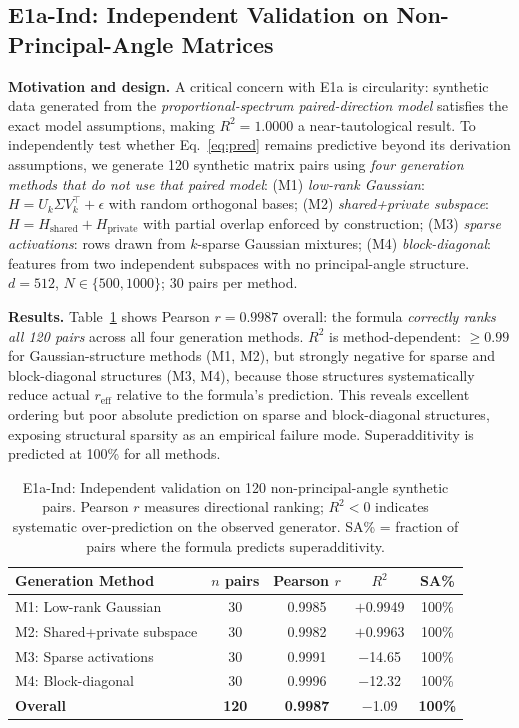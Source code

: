 \documentclass{article}
\begin{document}
\subsection{E1a-Ind: Independent Validation on Non-Principal-Angle Matrices}
\label{sec:e1a_ind}

\textbf{Motivation and design.}
A critical concern with E1a is circularity: synthetic data generated from the
\emph{proportional-spectrum paired-direction model} satisfies the exact
model assumptions,
making $R^2=1.0000$ a near-tautological result.
To independently test whether Eq.~\eqref{eq:pred} remains predictive
beyond its derivation assumptions, we generate 120 synthetic matrix pairs
using \emph{four generation methods that do not use that paired model}:
(M1) \emph{low-rank Gaussian}: $H=U_k\Sigma V_k^\top + \epsilon$ with random orthogonal bases;
(M2) \emph{shared+private subspace}: $H=H_{\mathrm{shared}}+H_{\mathrm{private}}$ with
partial overlap enforced by construction;
(M3) \emph{sparse activations}: rows drawn from $k$-sparse Gaussian mixtures;
(M4) \emph{block-diagonal}: features from two independent subspaces with no principal-angle structure.
$d=512$, $N\in\{500,1000\}$; 30 pairs per method.

\textbf{Results.}
Table~\ref{tab:e1a_ind} shows Pearson $r=0.9987$ overall: the formula
\emph{correctly ranks all 120 pairs} across all four generation methods.
$R^2$ is method-dependent: $\geq0.99$ for Gaussian-structure methods (M1, M2),
but strongly negative for sparse and block-diagonal structures (M3, M4),
because those structures systematically reduce actual $r_{\mathrm{eff}}$ relative to the formula's prediction.
This reveals excellent ordering but poor absolute prediction on sparse and
block-diagonal structures, exposing structural sparsity as an empirical
failure mode.
Superadditivity is predicted at 100\% for all methods.

\begin{table}[t]
\centering
\caption{E1a-Ind: Independent validation on 120 non-principal-angle synthetic pairs.
Pearson $r$ measures directional ranking; $R^2<0$ indicates systematic
over-prediction on the observed generator. SA\% = fraction of pairs where
the formula predicts superadditivity.}
\label{tab:e1a_ind}
\setlength{\tabcolsep}{5pt}
\begin{tabular}{lcccc}
\toprule
Generation Method & $n$ pairs & Pearson $r$ & $R^2$ & SA\% \\
\midrule
M1: Low-rank Gaussian      & 30 & 0.9985 & $+$0.9949 & 100\% \\
M2: Shared+private subspace & 30 & 0.9982 & $+$0.9963 & 100\% \\
M3: Sparse activations     & 30 & 0.9991 & $-$14.65  & 100\% \\
M4: Block-diagonal         & 30 & 0.9996 & $-$12.32  & 100\% \\
\midrule
\textbf{Overall}           & \textbf{120} & \textbf{0.9987} & $-$1.09 & \textbf{100\%} \\
\bottomrule
\end{tabular}
\end{table}
\end{document}
